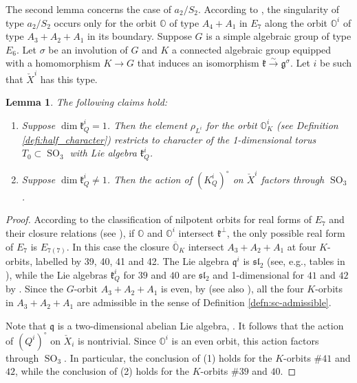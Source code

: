 \documentclass[12pt]{amsart}
\newcommand{\g}{\mathfrak{g}}
\newcommand{\Orb}{\mathbb{O}}
\newcommand{\kf}{\mathfrak{k}}
\newcommand{\slf}{\mathfrak{sl}}
\newtheorem{Lem}[Thm]{Lemma}
\theoremstyle{definition}
\numberwithin{equation}{section}
\begin{document}
The second lemma concerns the case of $a_2/S_2$. According to \cite{FJLS1}, the singularity of type $a_2/S_2$ occurs only for the orbit $\Orb$ of type $A_4+A_1$ in $E_7$  along the orbit $\Orb^i$ of type $A_3 + A_2 + A_1$ in its boundary. Suppose $G$ is a  simple algebraic group of type $E_6$. Let $\sigma$ be an involution of $G$ and $K$ a connected algebraic group equipped with a homomorphism $K\rightarrow G$ that induces
an isomorphism $\kf\xrightarrow{\sim} \g^\sigma$.  Let $i$ be such that $\check{X}^i$ has this type.

\begin{Lem}\label{Lem:character_integrality}
The following claims hold:
\begin{enumerate}
\item 
Suppose $\dim \kf^i_Q=1$.  Then the element $\rho_{L^i}$ for the orbit $\Orb^i_K$ (see Definition \ref{defi:half_character})
restricts to character of the 1-dimensional torus $T_0\subset \operatorname{SO}_3$ with Lie algebra $\kf^i_Q$. 
\item Suppose $\dim \kf^i_Q\neq 1$. Then the action of $(K^i_Q)^\circ$ on $\check{X}^i$ factors through $\operatorname{SO}_3$. 
\end{enumerate}
\end{Lem}

\begin{proof}
	According to the classification of nilpotent orbits for real forms of $E_7$ and their closure relations (see \cite{Dk3, Dk4, Dk5}), if $\Orb$ and $\Orb^i$ intersect $\kf^\perp$, the only possible real form of $E_7$ is $E_{7(7)}$. In this case the closure $\overline{\Orb}_K$ intersect $A_3 + A_2 + A_1$ at four $K$-orbits, labelled by 39, 40, 41 and 42.
The Lie algebra $\mathfrak{q}^i$ is $\mathfrak{sl}_2$ (see, e.g., tables in \cite[Section 13.1]{Carter}), while the Lie algebras $\kf^i_Q$ for $39$ and $40$ are $\slf_2$ and 1-dimensional for $41$ and $42$ by \cite[Table XI, pg. 513]{Dk0}. Since the $G$-orbit $A_3 + A_2 +A_1$ is even, by \cite[Chapter 2]{Schwartz} (see also \cite[Corollary 7.28]{Vogan}), all the four $K$-orbits in $A_3 + A_2 +A_1$ are admissible in the sense of Definition \ref{defn:sc-admissible}. 

Note that $\mathfrak{q}$ is a two-dimensional abelian Lie algebra, \cite[Section 13.1]{Carter}. It follows that the action of $(Q^i)^\circ$
on $\check{X}_i$ is nontrivial. Since $\Orb^i$ is an even orbit, this action factors through $\operatorname{SO}_3$.
In particular,  the conclusion of (1) holds for the $K$-orbits $\#41$ and $42$, while the conclusion of (2) holds for 
the $K$-orbits $\#39$ and $40$.
\end{proof}
\end{document}
